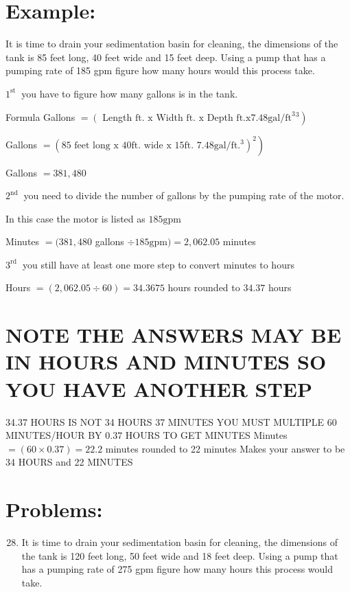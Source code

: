 \begin{enumerate}
\section{Example:}
It is time to drain your sedimentation basin for cleaning, the dimensions of the tank is 85 feet long, 40 feet wide and 15 feet deep. Using a pump that has a pumping rate of 185 gpm figure how many hours would this process take.

$1^{\text {st }}$ you have to figure how many gallons is in the tank.

Formula Gallons $=\left(\right.$ Length $\mathrm{ft}$. $\mathrm{x}$ Width $\mathrm{ft}$. $\mathrm{x}$ Depth $\left.\mathrm{ft} . \mathrm{x} 7.48 \mathrm{gal} / \mathrm{ft}^{3}{ }^{3}\right)$

Gallons $\left.=\left(85 \text { feet long x } 40 \mathrm{ft} \text {. wide x } 15 \mathrm{ft} \text {. } 7.48 \mathrm{gal} / \mathrm{ft} .^{3}\right)^{2}\right)$

Gallons $=381,480$

$2^{\text {nd }}$ you need to divide the number of gallons by the pumping rate of the motor.

In this case the motor is listed as $185 \mathrm{gpm}$

Minutes $=(381,480$ gallons $\div 185 \mathrm{gpm})=2,062.05$ minutes

$3^{\text {rd }}$ you still have at least one more step to convert minutes to hours

Hours $=(2,062.05 \div 60)=34.3675$ hours rounded to $34.37$ hours

\section{NOTE THE ANSWERS MAY BE IN HOURS AND MINUTES SO YOU HAVE ANOTHER STEP}
34.37 HOURS IS NOT 34 HOURS 37 MINUTES YOU MUST MULTIPLE 60 MINUTES/HOUR BY $0.37$ HOURS TO GET MINUTES Minutes $=(60 \times 0.37)=22.2$ minutes rounded to 22 minutes Makes your answer to be 34 HOURS and 22 MINUTES

\section{Problems:}
\begin{enumerate}
  \setcounter{enumi}{27}
  \item It is time to drain your sedimentation basin for cleaning, the dimensions of the tank is 120 feet long, 50 feet wide and 18 feet deep. Using a pump that has a pumping rate of 275 gpm figure how many hours this process would take.


\end{enumerate}
\end{enumerate}
